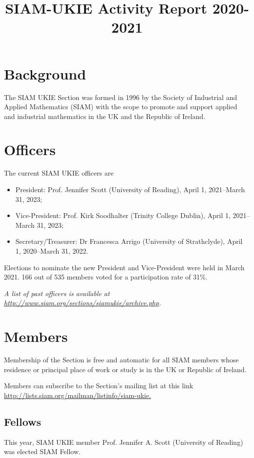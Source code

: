 \documentclass{article}
\title{\sc SIAM-UKIE Activity Report 2020-2021}
\begin{document}
\maketitle


\section*{Background}


The SIAM UKIE Section was formed in 1996 by the Society of Industrial and Applied Mathematics
(SIAM) with the scope to promote and support applied and industrial mathematics in the UK and
the Republic of Ireland.

\section*{Officers}
The current SIAM UKIE officers are
\begin{itemize}
\item President: Prof. Jennifer Scott (University of Reading), April 1, 2021–March 31, 2023;
\item Vice-President: Prof. Kirk Soodhalter (Trinity College Dublin), April 1, 2021–March 31, 2023;
\item Secretary/Treasurer: Dr Francesca Arrigo (University of Strathclyde), April 1, 2020–March 31, 2022.
\end{itemize}
Elections to nominate the new President and Vice-President were held in March 2021.
166 out of 535 members voted for a participation rate of 31\%. 

{\it A list of past officers is available at \url{http://www.siam.org/sections/siamukie/archive.php}.}

\section*{Members}

Membership of the Section is free and automatic for all SIAM members whose residence or principal
place of work or study is in the UK or Republic of Ireland.

Members can subscribe to the Section's mailing list at this link \url{http://lists.siam.org/mailman/listinfo/siam-ukie.} 

\subsection*{Fellows}

This year, SIAM UKIE member Prof. Jennifer A. Scott (University of Reading) was elected SIAM Fellow.
\end{document}
